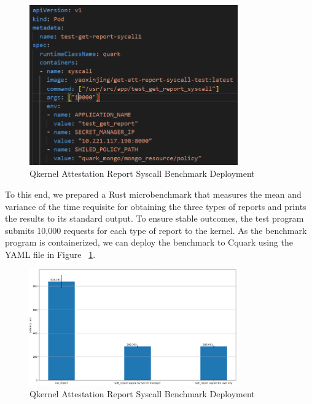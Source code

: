 \begin{figure}[H]
    \centering
    \includegraphics[width=0.8\textwidth]{images/perf_attestation_report_yaml.PNG}
    \caption[Qkernel Attestation Report Syscall Benchmark Deployment]{Qkernel Attestation Report Syscall Benchmark Deployment}
    \label{fig:perf_attestation_report_yaml}
\end{figure}

To this end, we prepared a Rust microbenchmark that measures the mean and variance of the time requisite for obtaining the three types of reports and prints the results to its standard output. To ensure stable outcomes, the test program submits 10,000 requests for each type of report to the kernel. 
As the benchmark program is containerized, we can deploy the benchmark to Cquark using the YAML file in Figure ~\ref{fig:perf_attestation_report_yaml}.

\begin{figure}[H]
    \centering
    \includegraphics[width=0.8\textwidth]{images/perf_attestation_report_result.PNG}
    \caption[Benchmark result of Attestation Report Syscall]{Qkernel Attestation Report Syscall Benchmark Deployment}
    \label{fig:perf_attestation_report_result}
\end{figure}

